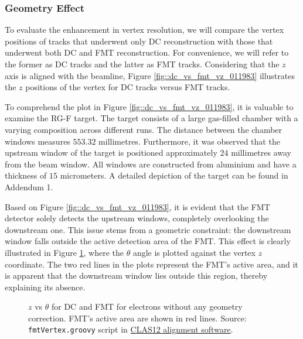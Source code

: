 \subsubsection{Geometry Effect}
\label{sssec::geometry_effect}
    To evaluate the enhancement in vertex resolution, we will compare the vertex positions of tracks that underwent only DC reconstruction with those that underwent both DC and FMT reconstruction.
    For convenience, we will refer to the former as DC tracks and the latter as FMT tracks.
    Considering that the $z$ axis is aligned with the beamline, Figure \ref{fig::dc_vs_fmt_vz_011983} illustrates the $z$ positions of the vertex for DC tracks versus FMT tracks.

    To comprehend the plot in Figure \ref{fig::dc_vs_fmt_vz_011983}, it is valuable to examine the RG-F target.
    The target consists of a large gas-filled chamber with a varying composition across different runs.
    The distance between the chamber windows measures $553.32$ millimetres.
    Furthermore, it was observed that the upstream window of the target is positioned approximately $24$ millimetres away from the beam window.
    All windows are constructed from aluminium and have a thickness of $15$ micrometers.
    A detailed depiction of the target can be found in Addendum 1.

    Based on Figure \ref{fig::dc_vs_fmt_vz_011983}, it is evident that the FMT detector solely detects the upstream windows, completely overlooking the downstream one.
    This issue stems from a geometric constraint: the downstream window falls outside the active detection area of the FMT.
    This effect is clearly illustrated in Figure \ref{fig::vz_vs_theta}, where the $\theta$ angle is plotted against the vertex $z$ coordinate.
    The two red lines in the plots represent the FMT's active area, and it is apparent that the downstream window lies outside this region, thereby explaining its absence.

    \begin{figure}[t!]
        \centering{}
        \caption[$z$ vs $\theta$ for DC and FMT.]{$z$ vs $\theta$ for DC and FMT for electrons without any geometry correction. FMT's active area are shown in red lines.
        Source: \texttt{fmtVertex.groovy} script in \hyperlink{github.com/JeffersonLab/clas12alignment}{CLAS12 alignment software}.}
        \label{fig::vz_vs_theta}
    \end{figure}

